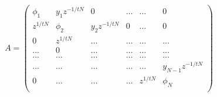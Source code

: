 \begin{equation}
A =
 \begin{pmatrix}
  \phi_1   & y_1 z^{-1/tN} & 0            & \dots &  \dots & 0     \\
   z^{1/tN} & \phi_2       & y_2 z^{-1/tN} & 0     & \dots  & 0     \\
   0       &     z^{1/tN}  & \dots        & \dots &  \dots & \dots \\
   \dots   &  0           &  \dots       & \dots & \dots  & \dots  \\
   \dots   & \dots        & \dots        & \dots & \dots  & \dots \\
   \dots   & \dots        & \dots        & \dots & \dots  &y_{N-1} z^{-1/tN}  \\
    0      & \dots        & \dots        & \dots & z^{1/tN}& \phi_{N} \\
 \end{pmatrix}
\end{equation}

